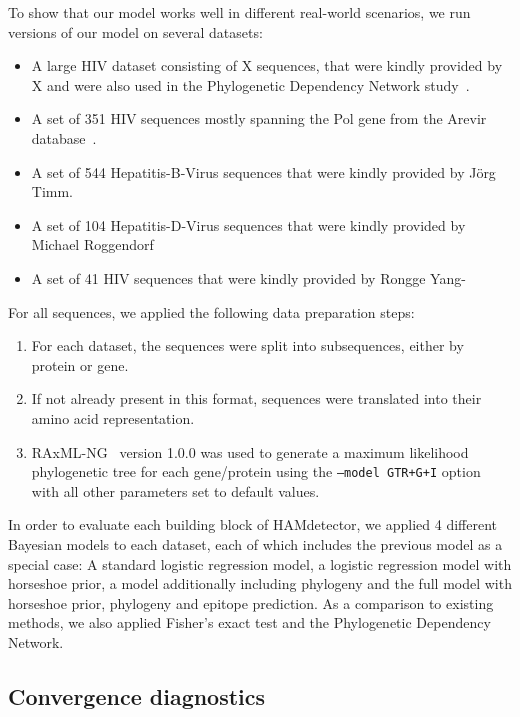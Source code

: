 \documentclass[fleqn,11pt]{SelfArx} %
\begin{document}
To show that our model works well in different real-world scenarios, we run versions of our model on several datasets:

\begin{itemize}
  \item A large HIV dataset consisting of X sequences, that were kindly provided by X and were also used in the Phylogenetic Dependency Network study~\cite{Carlson2008}.
  \item A set of 351 HIV sequences mostly spanning the Pol gene from the Arevir database~\cite{Roomp2006}.
  \item A set of 544 Hepatitis-B-Virus sequences that were kindly provided by Jörg Timm.
  \item A set of 104 Hepatitis-D-Virus sequences that were kindly provided by Michael Roggendorf
  \item A set of 41 HIV sequences that were kindly provided by Rongge Yang-
\end{itemize}

For all sequences, we applied the following data preparation steps:

\begin{enumerate}
  \item For each dataset, the sequences were split into subsequences, either by protein or gene.
  \item If not already present in this format, sequences were translated into their amino acid representation.
  \item RAxML-NG~\cite{Kozlov2019} version 1.0.0 was used to generate a maximum likelihood phylogenetic tree for each gene/protein using the \texttt{--model GTR+G+I} option with all other parameters set to default values.
\end{enumerate}

In order to evaluate each building block of HAMdetector, we applied 4 different Bayesian models to each dataset, each of which includes the previous model as a special case:
A standard logistic regression model, a logistic regression model with horseshoe prior, a model additionally including phylogeny and the full model with horseshoe prior, phylogeny and epitope prediction.
As a comparison to existing methods, we also applied Fisher's exact test and the Phylogenetic Dependency Network.

\subsection*{Convergence diagnostics}
\end{document}
